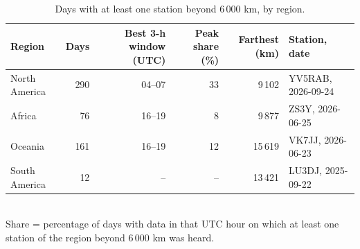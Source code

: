 \begin{table}[htbp]\centering\small
\caption{Days with at least one station beyond 6\,000 km, by region.}\label{tab:dxzones}
\begin{tabular}{lrrrrl}
\toprule
Region & Days & Best 3-h window (UTC) & Peak share (\%) & Farthest (km) & Station, date \\
\midrule
North America & 290 & 04--07 & 33 & 9\,102 & YV5RAB, 2026-09-24 \\
Africa & 76 & 16--19 & 8 & 9\,877 & ZS3Y, 2026-06-25 \\
Oceania & 161 & 16--19 & 12 & 15\,619 & VK7JJ, 2026-06-23 \\
South America & 12 & -- & -- & 13\,421 & LU3DJ, 2025-09-22 \\
\bottomrule
\end{tabular}
\\[2pt]{\footnotesize Share = percentage of days with data in that UTC hour on which at least one station of the region beyond 6\,000 km was heard.}
\end{table}
